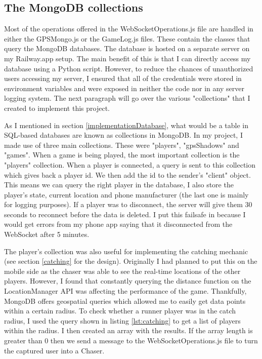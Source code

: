\documentclass{l4proj}
\begin{document}
\subsection{The MongoDB collections}
\label{mongocollections}
Most of the operations offered in the WebSocketOperations.js file are handled in either the GPSMongo.js or the GameLog.js
files. These contain the classes that query the MongoDB databases. The database is hosted on a separate
server on my Railway.app setup. The main benefit of this is that I can directly access my database using a Python
script. However, to reduce the chances of unauthorized users accessing my server, I ensured that all of the credentials
were stored in environment variables and were exposed in neither the code nor in any server logging system. The
next paragraph will go over the various "collections" that I created to implement this project.

As I mentioned in section \ref{implementationDatabase}, what would be a table in SQL-based databases are known as collections in MongoDB.
In my project, I made use of three main collections. These were "players", "gpsShadows" and "games". When a game is being played, the most
important collection is the "players" collection. When a player is connected, a query is sent to this collection which gives back a player id.
We then add the id to the sender's "client" object. This means we can query the right player in the database, I also store the player's state,
current location and phone manufacturer (the last one is mainly for logging purposes). If a player was to disconnect, the server will give
them 30 seconds to reconnect before the data is deleted. I put this failsafe in because I would get errors from my phone app saying
that it disconnected from the WebSocket after 5 minutes.

The player's collection was also useful for implementing the catching mechanic (see section \ref{catching} for the design). Originally I had planned to put this on the mobile side
as the chaser was able to see the real-time locations of the other players. However, I found that constantly querying the distance function
on the LocationManager API was affecting the performance of the game. Thankfully, MongoDB offers geospatial queries which allowed me to
easily get data points within a certain radius. To check whether a runner player was in the catch radius, I used the query shown in
listing \ref{lst:catching} to get a list of players within the radius. I then created an array with the results. If the array length is greater
than 0 then we send a message to the WebSocketOperations.js file to turn the captured user into a Chaser.
\end{document}

